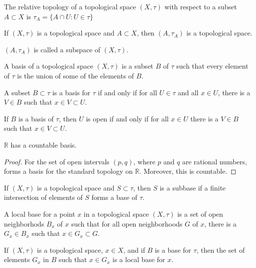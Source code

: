         \begin{definition}
            The relative topology of a
            topological space $(X,\tau)$ with
            respect to a subset $A\subset{X}$
            is $\tau_{A}=\{A\cap{U}:U\in\tau\}$
        \end{definition}
        \begin{theorem}
            If $(X,\tau)$ is a topological space and
            $A\subset{X}$, then
            $(A,\tau_{A})$ is a topological space.
        \end{theorem}
        $(A,\tau_{A})$ is called a subspace of
        $(X,\tau)$.
        \begin{definition}
            A basis of a topological space
            $(X,\tau)$ is a subset $B$ of
            $\tau$ such that every element
            of $\tau$ is the union of some of the
            elements of $B$.
        \end{definition}
        \begin{theorem}
            A subset $B\subset\tau$ is a basis
            for $\tau$ if and only if for all
            $U\in\tau$ and all $x\in{U}$, there is
            a $V\in{B}$ such that
            $x\in{V}\subset{U}$.
        \end{theorem}
        \begin{theorem}
            If $B$ is a basis of $\tau$, then
            $U$ is open if and only if for all
            $x\in{U}$ there is a $V\in{B}$ such that
            $x\in{V}\subset{U}$.
        \end{theorem}
        \begin{theorem}
            $\mathbb{R}$ has a countable basis.
        \end{theorem}
        \begin{proof}
            For the set of open intervals
            $(p,q)$, where $p$ and $q$ are rational
            numbers, forms a basis for the standard
            topology on $\mathbb{R}$. Moreover, this
            is countable.
        \end{proof}
        \begin{definition}
            If $(X,\tau)$ is a topological space
            and $S\subset\tau$, then $S$ is a subbase
            if a finite intersection of elements of $S$
            forms a base of $\tau$.
        \end{definition}
        \begin{definition}
            A local base for a point
            $x$ in a topological space $(X,\tau)$
            is a set of open neighborhods $B_{x}$ of
            $x$ such that for all open neighborhoods $G$
            of $x$, there is a $G_{x}\in{B_{x}}$ such that
            $x\in{G_{x}}\subset{G}$.
        \end{definition}
        \begin{theorem}
            If $(X,\tau)$ is a topological space, $x\in{X}$,
            and if $B$ is a base for $\tau$, then
            the set of elements $G_{x}$ in $B$ such that
            $x\in{G_{x}}$ is a local base for $x$.
        \end{theorem}
